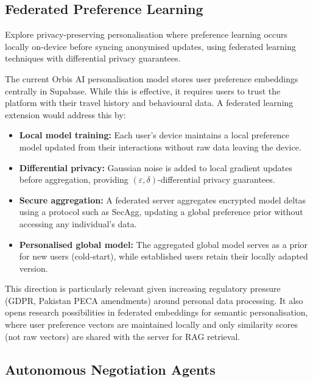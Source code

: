 \documentclass[12pt, a4paper]{article}
\begin{document}
\subsection{Federated Preference Learning}

\begin{highlightbox}
Explore privacy-preserving personalisation where preference learning occurs locally on-device before syncing anonymised updates, using federated learning techniques with differential privacy guarantees.
\end{highlightbox}

The current Orbis AI personalisation model stores user preference embeddings centrally in Supabase. While this is effective, it requires users to trust the platform with their travel history and behavioural data. A federated learning extension would address this by:

\begin{itemize}[leftmargin=1.5cm, itemsep=0.4em]
  \item \textbf{Local model training:} Each user's device maintains a local preference model updated from their interactions without raw data leaving the device.
  \item \textbf{Differential privacy:} Gaussian noise is added to local gradient updates before aggregation, providing $(\varepsilon, \delta)$-differential privacy guarantees.
  \item \textbf{Secure aggregation:} A federated server aggregates encrypted model deltas using a protocol such as SecAgg, updating a global preference prior without accessing any individual's data.
  \item \textbf{Personalised global model:} The aggregated global model serves as a prior for new users (cold-start), while established users retain their locally adapted version.
\end{itemize}

This direction is particularly relevant given increasing regulatory pressure (GDPR, Pakistan PECA amendments) around personal data processing. It also opens research possibilities in federated embeddings for semantic personalisation, where user preference vectors are maintained locally and only similarity scores (not raw vectors) are shared with the server for RAG retrieval.

\subsection{Autonomous Negotiation Agents}
\end{document}
